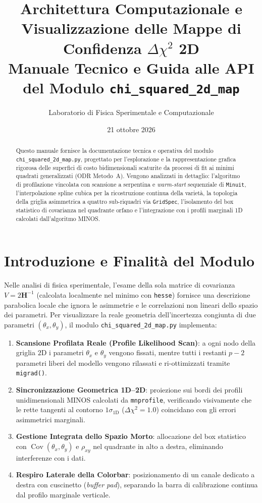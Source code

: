 \documentclass[11pt,a4paper]{article}
\title{\textbf{Architettura Computazionale e Visualizzazione delle Mappe di Confidenza $\Delta\chi^2$ 2D}\\\large Manuale Tecnico e Guida alle API del Modulo \texttt{chi\_squared\_2d\_map}}
\author{Laboratorio di Fisica Sperimentale e Computazionale}
\date{21 ottobre 2026}
\begin{document}
\maketitle

\begin{abstract}
Questo manuale fornisce la documentazione tecnica e operativa del modulo \texttt{chi\_squared\_2d\_map.py}, progettato per l'esplorazione e la rappresentazione grafica rigorosa delle superfici di costo bidimensionali scaturite da processi di fit ai minimi quadrati generalizzati (ODR Metodo~A). Vengono analizzati in dettaglio: l'algoritmo di profilazione vincolata con scansione a serpentina e \emph{warm-start} sequenziale di \texttt{Minuit}, l'interpolazione spline cubica per la ricostruzione continua della varietà, la topologia della griglia asimmetrica a quattro sub-riquadri via \texttt{GridSpec}, l'isolamento del box statistico di covarianza nel quadrante orfano e l'integrazione con i profili marginali 1D calcolati dall'algoritmo MINOS.
\end{abstract}

\tableofcontents
\newpage

\section{Introduzione e Finalità del Modulo}

Nelle analisi di fisica sperimentale, l'esame della sola matrice di covarianza $V = 2\mathbf{H}^{-1}$ (calcolata localmente nel minimo con \texttt{hesse}) fornisce una descrizione parabolica locale che ignora le asimmetrie e le correlazioni non lineari dello spazio dei parametri. Per visualizzare la reale geometria dell'incertezza congiunta di due parametri $(\theta_x, \theta_y)$, il modulo \texttt{chi\_squared\_2d\_map.py} implementa:
\begin{enumerate}
    \item \textbf{Scansione Profilata Reale (Profile Likelihood Scan)}: a ogni nodo della griglia $2\mathrm{D}$ i parametri $\theta_x$ e $\theta_y$ vengono fissati, mentre tutti i restanti $p-2$ parametri liberi del modello vengono rilassati e ri-ottimizzati tramite \texttt{migrad()}.
    \item \textbf{Sincronizzazione Geometrica 1D--2D}: proiezione sui bordi dei profili unidimensionali MINOS calcolati da \texttt{mnprofile}, verificando visivamente che le rette tangenti al contorno $1\sigma_{1\mathrm{D}}$ ($\Delta\chi^2 = 1.0$) coincidano con gli errori asimmetrici marginali.
    \item \textbf{Gestione Integrata dello Spazio Morto}: allocazione del box statistico con $\operatorname{Cov}(\theta_x, \theta_y)$ e $\rho_{xy}$ nel quadrante in alto a destra, eliminando interferenze con i dati.
    \item \textbf{Respiro Laterale della Colorbar}: posizionamento di un canale dedicato a destra con cuscinetto (\emph{buffer pad}), separando la barra di calibrazione continua dal profilo marginale verticale.
\end{enumerate}
\end{document}
